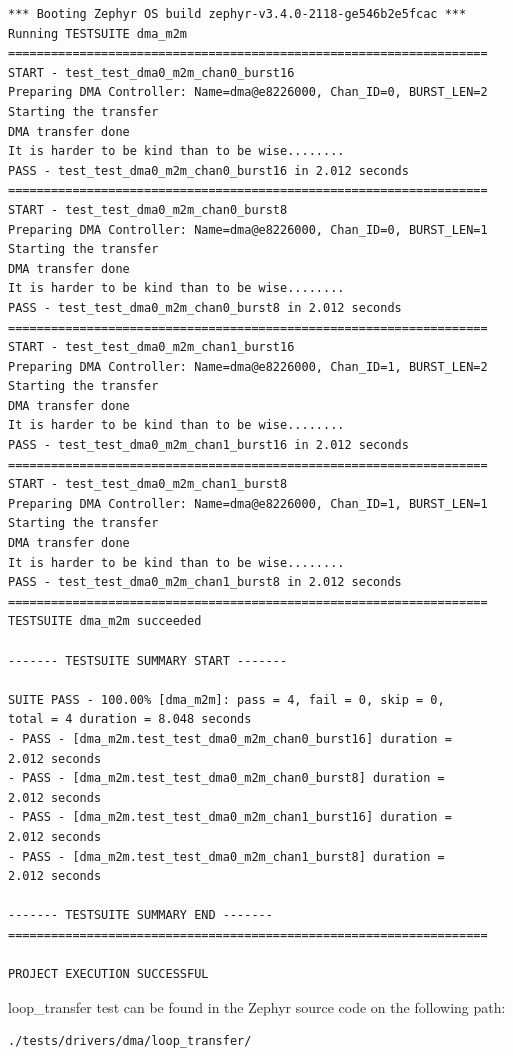 \documentclass[11pt,a4paper,oneside]{article}
\begin{document}
\begin{lstlisting}
*** Booting Zephyr OS build zephyr-v3.4.0-2118-ge546b2e5fcac ***
Running TESTSUITE dma_m2m
===================================================================
START - test_test_dma0_m2m_chan0_burst16
Preparing DMA Controller: Name=dma@e8226000, Chan_ID=0, BURST_LEN=2
Starting the transfer
DMA transfer done
It is harder to be kind than to be wise........
PASS - test_test_dma0_m2m_chan0_burst16 in 2.012 seconds
===================================================================
START - test_test_dma0_m2m_chan0_burst8
Preparing DMA Controller: Name=dma@e8226000, Chan_ID=0, BURST_LEN=1
Starting the transfer
DMA transfer done
It is harder to be kind than to be wise........
PASS - test_test_dma0_m2m_chan0_burst8 in 2.012 seconds
===================================================================
START - test_test_dma0_m2m_chan1_burst16
Preparing DMA Controller: Name=dma@e8226000, Chan_ID=1, BURST_LEN=2
Starting the transfer
DMA transfer done
It is harder to be kind than to be wise........
PASS - test_test_dma0_m2m_chan1_burst16 in 2.012 seconds
===================================================================
START - test_test_dma0_m2m_chan1_burst8
Preparing DMA Controller: Name=dma@e8226000, Chan_ID=1, BURST_LEN=1
Starting the transfer
DMA transfer done
It is harder to be kind than to be wise........
PASS - test_test_dma0_m2m_chan1_burst8 in 2.012 seconds
===================================================================
TESTSUITE dma_m2m succeeded

------- TESTSUITE SUMMARY START -------

SUITE PASS - 100.00% [dma_m2m]: pass = 4, fail = 0, skip = 0,
total = 4 duration = 8.048 seconds
- PASS - [dma_m2m.test_test_dma0_m2m_chan0_burst16] duration =
2.012 seconds
- PASS - [dma_m2m.test_test_dma0_m2m_chan0_burst8] duration =
2.012 seconds
- PASS - [dma_m2m.test_test_dma0_m2m_chan1_burst16] duration =
2.012 seconds
- PASS - [dma_m2m.test_test_dma0_m2m_chan1_burst8] duration =
2.012 seconds

------- TESTSUITE SUMMARY END -------
===================================================================

PROJECT EXECUTION SUCCESSFUL
\end{lstlisting}

loop\_transfer test can be found in the Zephyr source code on the
following path:

\begin{lstlisting}
./tests/drivers/dma/loop_transfer/
\end{lstlisting}
\end{document}
